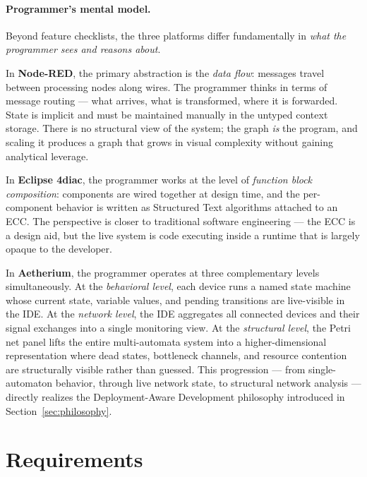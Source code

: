\paragraph{Programmer's mental model.}
Beyond feature checklists, the three platforms differ fundamentally in \emph{what the programmer sees and reasons about}.

In \textbf{Node-RED}, the primary abstraction is the \emph{data flow}: messages travel between processing nodes along wires. The programmer thinks in terms of message routing --- what arrives, what is transformed, where it is forwarded. State is implicit and must be maintained manually in the untyped context storage. There is no structural view of the system; the graph \emph{is} the program, and scaling it produces a graph that grows in visual complexity without gaining analytical leverage.

In \textbf{Eclipse 4diac}, the programmer works at the level of \emph{function block composition}: components are wired together at design time, and the per-component behavior is written as Structured Text algorithms attached to an ECC. The perspective is closer to traditional software engineering --- the ECC is a design aid, but the live system is code executing inside a runtime that is largely opaque to the developer.

In \textbf{Aetherium}, the programmer operates at three complementary levels simultaneously. At the \emph{behavioral level}, each device runs a named state machine whose current state, variable values, and pending transitions are live-visible in the IDE. At the \emph{network level}, the IDE aggregates all connected devices and their signal exchanges into a single monitoring view. At the \emph{structural level}, the Petri net panel lifts the entire multi-automata system into a higher-dimensional representation where dead states, bottleneck channels, and resource contention are structurally visible rather than guessed. This progression --- from single-automaton behavior, through live network state, to structural network analysis --- directly realizes the Deployment-Aware Development philosophy introduced in Section~\ref{sec:philosophy}.

\section{Requirements}
\label{sec:requirements}

